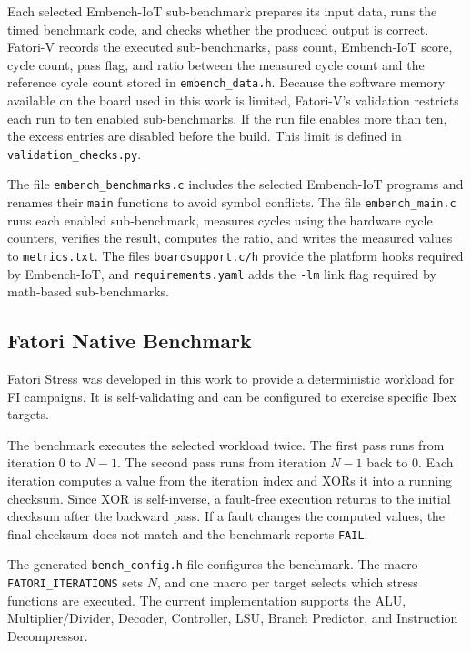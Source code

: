 Each selected Embench-IoT sub-benchmark prepares its input data, runs the timed benchmark code, and checks whether the produced output is correct. \ac{Fatori-V} records the executed sub-benchmarks, pass count, Embench-IoT score, cycle count, pass flag, and ratio between the measured cycle count and the reference cycle count stored in \texttt{embench\_data.h}. Because the software memory available on the board used in this work is limited, \ac{Fatori-V}'s validation restricts each run to ten enabled sub-benchmarks. If the run file enables more than ten, the excess entries are disabled before the build. This limit is defined in \texttt{validation\_checks.py}.

The file \texttt{embench\_benchmarks.c} includes the selected Embench-IoT programs and renames their \texttt{main} functions to avoid symbol conflicts. The file \texttt{embench\_main.c} runs each enabled sub-benchmark, measures cycles using the hardware cycle counters, verifies the result, computes the ratio, and writes the measured values to \texttt{metrics.txt}. The files \texttt{boardsupport.c/h} provide the platform hooks required by Embench-IoT, and \texttt{requirements.yaml} adds the \texttt{-lm} link flag required by math-based sub-benchmarks.






\subsection{Fatori Native Benchmark}
\label{chap7:fatori_stress}

Fatori Stress was developed in this work to provide a deterministic workload for \ac{FI} campaigns. It is self-validating and can be configured to exercise specific Ibex targets.

The benchmark executes the selected workload twice. The first pass runs from iteration \(0\) to \(N-1\). The second pass runs from iteration \(N-1\) back to \(0\). Each iteration computes a value from the iteration index and XORs it into a running checksum. Since XOR is self-inverse, a fault-free execution returns to the initial checksum after the backward pass. If a fault changes the computed values, the final checksum does not match and the benchmark reports \texttt{FAIL}.

The generated \texttt{bench\_config.h} file configures the benchmark. The macro \texttt{FATORI\_ITERATIONS} sets \(N\), and one macro per target selects which stress functions are executed. The current implementation supports the \ac{ALU}, Multiplier/Divider, Decoder, Controller, \ac{LSU}, Branch Predictor, and Instruction Decompressor.

